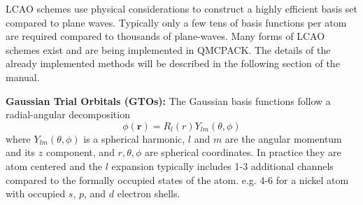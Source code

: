%
%

LCAO schemes use physical considerations to construct a highly
efficient basis set compared to plane waves. Typically only a few tens
of basis functions per atom are required compared to thousands of
plane-waves. Many forms of LCAO schemes exist and are being
implemented in QMCPACK. The details of the already implemented methods
will be described in the following section of the manual.

\noindent \textbf{Gaussian Trial Orbitals (GTOs):}
 The Gaussian basis functions follow a radial-angular decomposition
\begin{equation}
     \phi (\mathbf{r} )=R_{l}(r)Y_{lm}(\theta ,\phi )
\end{equation}
where $ Y_{{lm}}(\theta ,\phi )$ is a spherical harmonic, $l$ and $m$
are the angular momentum and its $z$ component, and $r,\theta ,\phi $
are spherical coordinates. In practice they are atom centered and the
$l$ expansion typically includes 1-3 additional channels compared to
the formally occupied states of the atom. e.g. 4-6 for a nickel atom with
occupied $s$, $p$, and $d$ electron shells.


